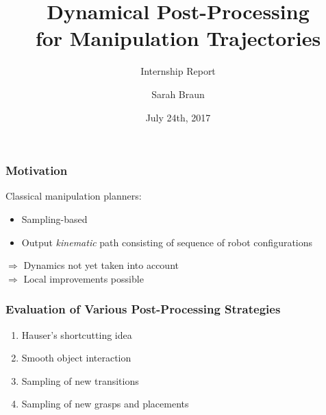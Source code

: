 \documentclass[12pt, %
			  t     %
]{beamer}%
\title{Dynamical Post-Processing\\ for Manipulation Trajectories}%
\subtitle{Internship Report}%
\author{Sarah Braun}%
\institute[TU München]{Technische Universität München}%
\date{July 24th, 2017}%
\begin{document}

\begin{frame}[plain]
  \titlepage
\end{frame}

\begin{frame}
\frametitle{Motivation}
Classical manipulation planners:
\begin{itemize}
\item Sampling-based
\item Output \textit{kinematic} path consisting of sequence of robot configurations
\end{itemize}

$\Rightarrow$ Dynamics not yet taken into account\\
$\Rightarrow$ Local improvements possible

\end{frame}



\begin{frame}
  \frametitle{Evaluation of Various Post-Processing Strategies}
  \begin{enumerate}
  \item Hauser's shortcutting idea
  \item Smooth object interaction
  \item Sampling of new transitions
  \item Sampling of new grasps and placements
  \end{enumerate}
\end{frame}
\end{document}
